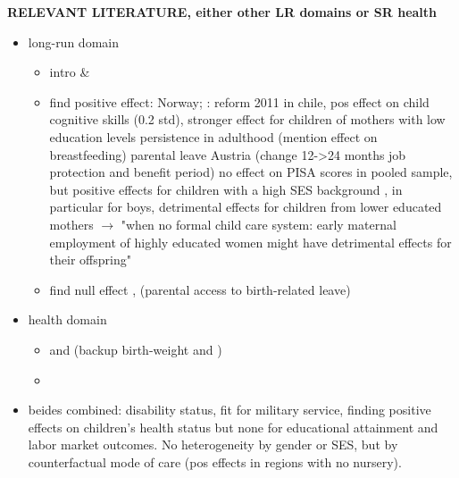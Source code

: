 \documentclass[11pt, a4paper]{article} %
\begin{document}
\textbf{RELEVANT LITERATURE, either other LR domains or SR health} 
\begin{itemize}
	\item long-run domain
	\begin{itemize}
		\item intro \cite{currie2011human} \& \cite{almond2017childhood}
		\item find positive effect: \cite{carneiro2015flying} Norway; \cite{albagli2018}: reform 2011 in chile, pos effect on child cognitive skills (0.2 std), stronger effect for children of mothers with low education levels persistence in adulthood (mention effect on breastfeeding)  \cite{danzer2017} parental leave Austria (change 12->24 months job protection and benefit period) no effect on PISA scores in pooled sample, but positive effects for children with a high SES background , in particular for boys, detrimental effects for children from lower educated mothers $\rightarrow$ "when no formal  child care system: early maternal employment of highly educated women might have detrimental effects for their offspring"
		\item find null effect \cite{Dahl2016Case}, \cite{rasmussen2010increasing} (parental access to birth-related leave)
	\end{itemize}
	\item health domain
	\begin{itemize}
		\item \cite{stearns2015effects} and \cite{rossin2011effects} (backup birth-weight \cite{almond2005costs} and \cite{currie2007biology})
		\item \cite{beuchert2016}
	\end{itemize}
	\item beides combined: \cite{danzer2017parental} disability status, fit for military service, finding positive effects on children's health status but none for educational attainment and labor market outcomes. No heterogeneity by gender or SES, but by counterfactual mode of care (pos effects in regions with no nursery).
\end{itemize}
\end{document}
